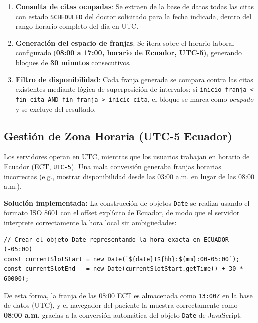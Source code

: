 \documentclass[a4paper,12pt]{article}
\begin{document}
    \begin{enumerate}
        \item \textbf{Consulta de citas ocupadas}: Se extraen de la base de datos todas las citas con estado \texttt{SCHEDULED} del doctor solicitado para la fecha indicada, dentro del rango horario completo del día en UTC.
        \item \textbf{Generación del espacio de franjas}: Se itera sobre el horario laboral configurado (\textbf{08:00 a 17:00, horario de Ecuador, UTC-5}), generando bloques de \textbf{30 minutos} consecutivos.
        \item \textbf{Filtro de disponibilidad}: Cada franja generada se compara contra las citas existentes mediante lógica de superposición de intervalos: si \texttt{inicio\_franja < fin\_cita AND fin\_franja > inicio\_cita}, el bloque se marca como \textit{ocupado} y se excluye del resultado.
    \end{enumerate}

    \subsection{Gestión de Zona Horaria (UTC-5 Ecuador)}

    Los servidores operan en UTC, mientras que los usuarios trabajan en horario de Ecuador (ECT, \texttt{UTC-5}). Una mala conversión generaba franjas horarias incorrectas (e.g., mostrar disponibilidad desde las 03:00 a.m. en lugar de las 08:00 a.m.).

    \textbf{Solución implementada:} La construcción de objetos \texttt{Date} se realiza usando el formato ISO 8601 con el offset explícito de Ecuador, de modo que el servidor interprete correctamente la hora local sin ambigüedades:

    \begin{lstlisting}[caption={Generación de franja con offset correcto --- \texttt{appointments.service.ts}}]
// Crear el objeto Date representando la hora exacta en ECUADOR (-05:00)
const currentSlotStart = new Date(`${date}T${hh}:${mm}:00-05:00`);
const currentSlotEnd   = new Date(currentSlotStart.getTime() + 30 * 60000);
    \end{lstlisting}

    De esta forma, la franja de las 08:00 ECT es almacenada como \texttt{13:00Z} en la base de datos (UTC), y el navegador del paciente la muestra correctamente como \textbf{08:00 a.m.} gracias a la conversión automática del objeto \texttt{Date} de JavaScript.
\end{document}
